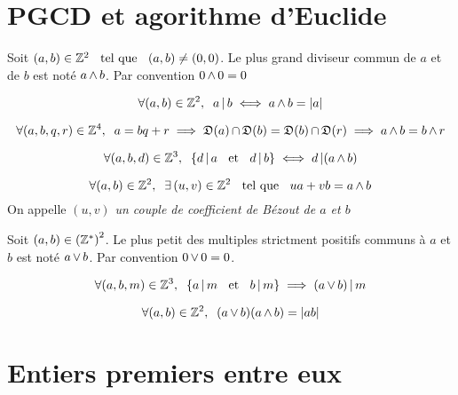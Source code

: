\section{PGCD et agorithme d'Euclide}

\begin{dfn}[PDCD]
Soit $(a, b) \in \mathbb{Z}^2 \;\;\text{ tel que }\;\; (a, b) \neq (0, 0)$.
Le plus grand diviseur commun de $a$ et de $b$ est noté $a \operatorname{\wedge} b$.
Par convention $0 \operatorname{\wedge} 0 = 0$
\end{dfn}

\begin{rem}
\[
    \forall (a, b) \in \mathbb{Z}^2, \;\; a \operatorname{|} b \iff a \operatorname{\wedge} b = |a|
\]
\end{rem}

\begin{prp}
\[
    \forall (a, b, q, r) \in \mathbb{Z}^4, \;\; a = b q + r
    \implies \operatorname{\mathfrak{D}}(a) \operatorname{\cap} \operatorname{\mathfrak{D}}(b) = \operatorname{\mathfrak{D}}(b) \operatorname{\cap} \operatorname{\mathfrak{D}}(r)
    \implies a \operatorname{\wedge} b = b \operatorname{\wedge} r
\]
\end{prp}

\begin{prp}
\[
    \forall (a, b, d) \in \mathbb{Z}^3, \;\;
    \left\{ d \operatorname{|} a \;\;\text{ et }\;\; d \operatorname{|} b \right\}
    \iff d \operatorname{|} (a \operatorname{\wedge} b)
\]
\end{prp}

\begin{prp}
\[
    \forall (a, b) \in \mathbb{Z}^2, \;\; \exists \, (u, v) \in \mathbb{Z}^2 \;\;\text{ tel que }\;\;
    u a + v b = a \operatorname{\wedge} b
\]
On appelle $(u, v)$ \emph{un couple de coefficient de Bézout de $a$ et $b$}
\end{prp}

\begin{dfn}[PPCM]
Soit $(a, b) \in \left(\mathbb{Z}^*\right)^2$.
Le plus petit des multiples strictment positifs communs à $a$ et $b$ est
noté $a \operatorname{\vee} b$.
Par convention $0 \operatorname{\vee} 0 = 0$.
\end{dfn}

\begin{prp}
\[
    \forall (a, b, m) \in \mathbb{Z}^3, \;\;
    \left\{ a \operatorname{|} m \;\;\text{ et }\;\; b \operatorname{|} m \right\}
    \implies (a \operatorname{\vee} b) \operatorname{|} m
\]
\end{prp}

\begin{prp}
\[
    \forall (a, b) \in \mathbb{Z}^2, \;\; (a \operatorname{\vee} b) (a \operatorname{\wedge} b) = |a b|
\]
\end{prp}

\section{Entiers premiers entre eux}

